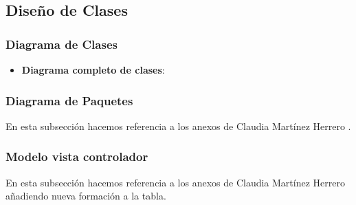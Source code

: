 \subsection{Diseño de Clases}

\subsubsection{Diagrama de Clases}

\begin{itemize}
	\tightlist
	\item
	\textbf{Diagrama completo de clases}:
	
	
	
\end{itemize}

\subsubsection{Diagrama de Paquetes}

En esta subsección hacemos referencia a los anexos de Claudia Martínez Herrero \cite{claudia:anexo}.


\subsubsection{Modelo vista controlador}

En esta subsección hacemos referencia a los anexos de Claudia Martínez Herrero \cite{claudia:anexo} añadiendo nueva formación a la tabla.

